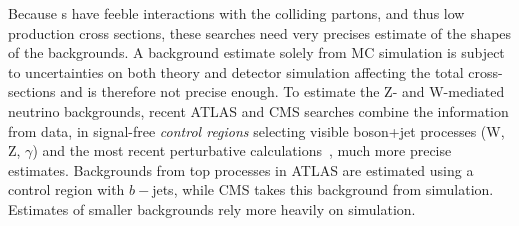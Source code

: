 Because {\IP}s have feeble interactions with the colliding partons, and thus low production cross sections, these searches need very precises estimate of the shapes of the backgrounds.
A background estimate solely from MC simulation is subject to uncertainties on both theory and detector simulation affecting the total cross-sections and is therefore not precise enough.
To estimate the Z- and W-mediated neutrino backgrounds, recent ATLAS and CMS searches combine the information from data, in signal-free \textit{control regions} selecting visible boson+jet processes (W, Z, $\gamma$) and the most recent perturbative calculations~\cite{Lindert:2017olm}, much more precise estimates.
Backgrounds from top processes in ATLAS are estimated using a control region with $b-$jets, while CMS takes this background from simulation.
Estimates of smaller backgrounds rely more heavily on simulation.


